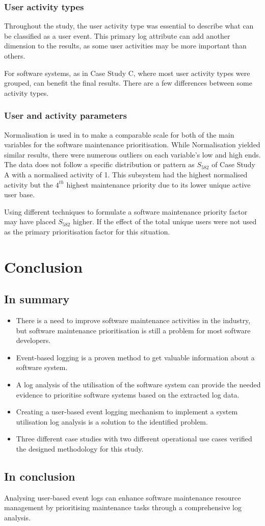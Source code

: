 \subsubsection{User activity types}
Throughout the study, the user activity type was essential to describe what can be classified as a user event. This primary log attribute can add another dimension to the results, as some user activities may be more important than others. \par For software systems, as in Case Study C, where most user activity types were grouped, can benefit the final results. There are a few differences between some activity types. 

\subsubsection{User and activity parameters}
\par Normalisation is used in  to make a comparable scale for both of the main variables for the software maintenance prioritisation. While Normalisation yielded similar results, there were numerous outliers on each variable's low and high ends. The data does not follow a specific distribution or pattern as $S_{582}$ of Case Study A with a normalised activity of 1. This subsystem had the highest normalised activity but the $4^{th}$ highest maintenance priority due to its lower unique active user base.\par Using different techniques to formulate a software maintenance priority factor may have placed $S_{582}$ higher. If the effect of the total unique users were not used as the primary prioritisation factor for this situation. 

\clearpage

\section{Conclusion}

\subsection{In summary}
\begin{itemize}
	\item There is a need to improve software maintenance activities in the industry, but software maintenance prioritisation is still a problem for most software developers.
	\item Event-based logging is a proven method to get valuable information about a software system.
	\item A log analysis of the utilisation of the software system can provide the needed evidence to prioritise software systems based on the extracted log data.
	\item Creating a user-based event logging mechanism to implement a system utilisation log analysis is a solution to the identified problem.
	\item Three different case studies with two different operational use cases verified the designed methodology for this study.
\end{itemize}

\subsection{In conclusion}
Analysing user-based event logs can enhance software maintenance resource management by prioritising maintenance tasks through a comprehensive log analysis.